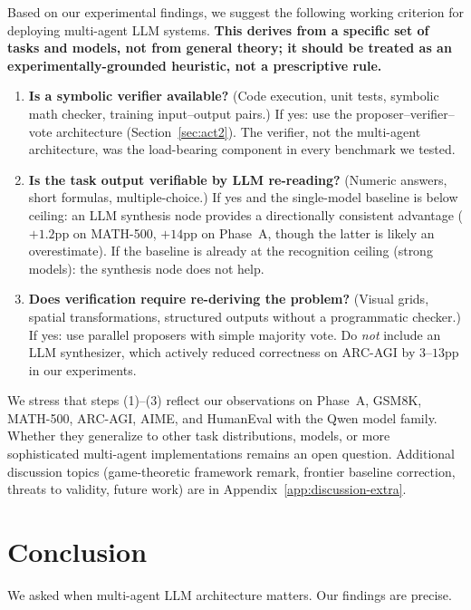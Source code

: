 \documentclass[11pt]{amsart}
\newcommand\1{{\mathds{1}}}
\theoremstyle{definition}
\theoremstyle{remark}
\numberwithin{equation}{section}
\begin{document}
Based on our experimental findings, we suggest the following working criterion for deploying multi-agent LLM systems.
\textbf{This derives from a specific set of tasks and models, not from general theory; it should be treated as an experimentally-grounded heuristic, not a prescriptive rule.}
\begin{enumerate}[leftmargin=1.4em, itemsep=2pt]
\item \textbf{Is a symbolic verifier available?} (Code execution, unit tests, symbolic math checker, training input--output pairs.)
If yes: use the proposer--verifier--vote architecture (Section~\ref{sec:act2}).
The verifier, not the multi-agent architecture, was the load-bearing component in every benchmark we tested.
\item \textbf{Is the task output verifiable by LLM re-reading?} (Numeric answers, short formulas, multiple-choice.)
If yes and the single-model baseline is below ceiling: an LLM synthesis node provides a directionally consistent advantage ($+1.2$pp on MATH-500, $+14$pp on Phase~A, though the latter is likely an overestimate).
If the baseline is already at the recognition ceiling (strong models): the synthesis node does not help.
\item \textbf{Does verification require re-deriving the problem?} (Visual grids, spatial transformations, structured outputs without a programmatic checker.)
If yes: use parallel proposers with simple majority vote.
Do \emph{not} include an LLM synthesizer, which actively reduced correctness on ARC-AGI by $3$--$13$pp in our experiments.
\end{enumerate}
We stress that steps (1)--(3) reflect our observations on Phase~A, GSM8K, MATH-500, ARC-AGI, AIME, and HumanEval with the Qwen model family.
Whether they generalize to other task distributions, models, or more sophisticated multi-agent implementations remains an open question.
Additional discussion topics (game-theoretic framework remark, frontier baseline correction, threats to validity, future work) are in Appendix~\ref{app:discussion-extra}.

\section{Conclusion}\label{sec:conclusion}

We asked when multi-agent LLM architecture matters.
Our findings are precise.
\end{document}
